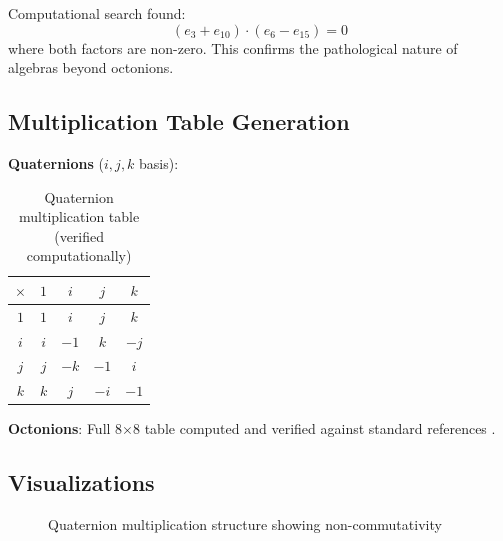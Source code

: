 \begin{example}
Computational search found:
\begin{equation}
(e_3 + e_{10}) \cdot (e_6 - e_{15}) = 0
\end{equation}
where both factors are non-zero. This confirms the pathological nature of algebras beyond octonions.
\end{example}

\subsection{Multiplication Table Generation}

\textbf{Quaternions} ($i, j, k$ basis):
\begin{table}[H]
\centering
\begin{tabular}{c|cccc}
$\times$ & $1$ & $i$ & $j$ & $k$ \\
\hline
$1$ & $1$ & $i$ & $j$ & $k$ \\
$i$ & $i$ & $-1$ & $k$ & $-j$ \\
$j$ & $j$ & $-k$ & $-1$ & $i$ \\
$k$ & $k$ & $j$ & $-i$ & $-1$ \\
\end{tabular}
\caption{Quaternion multiplication table (verified computationally)}
\end{table}

\textbf{Octonions}: Full 8$\times$8 table computed and verified against standard references \cite{baez2001octonions}.

\subsection{Visualizations}

\begin{figure}[H]
\centering
{}
\caption{Quaternion multiplication structure showing non-commutativity}
\label{fig:quaternion_mult}
\end{figure}


